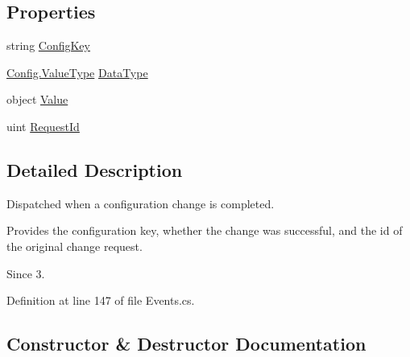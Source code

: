 \subsection*{Properties}
\begin{DoxyCompactItemize}
\item 
string \mbox{\hyperlink{class_leap_1_1_set_config_response_event_args_a56eb4389fe7af0495d16764ccc7423c6}{Config\+Key}}
\item 
\mbox{\hyperlink{class_leap_1_1_config_aee9819af7eacacc324aa72619310a9d8}{Config.\+Value\+Type}} \mbox{\hyperlink{class_leap_1_1_set_config_response_event_args_a0efcba318f3be923944fc7958279f6d3}{Data\+Type}}
\item 
object \mbox{\hyperlink{class_leap_1_1_set_config_response_event_args_af0e62482b156c77d3c3796bb9e8a1661}{Value}}
\item 
uint \mbox{\hyperlink{class_leap_1_1_set_config_response_event_args_a12762ce21e86f99bd99f45342a98d80c}{Request\+Id}}
\end{DoxyCompactItemize}


\subsection{Detailed Description}
Dispatched when a configuration change is completed. 

Provides the configuration key, whether the change was successful, and the id of the original change request. \begin{DoxySince}{Since}
3. 
\end{DoxySince}


Definition at line 147 of file Events.\+cs.



\subsection{Constructor \& Destructor Documentation}
\mbox{\label{class_leap_1_1_set_config_response_event_args_a1af9053af3f5a82c10f227ea10f7423f}} 
